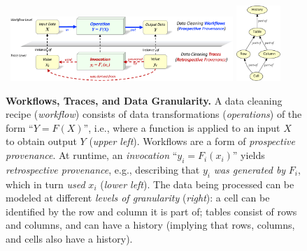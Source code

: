 \documentclass[conference]{ijdc-v14}
\newcommand{\openrefine}{\textrm{OpenRefine}\xspace}
\begin{document}
\begin{figure}[t]
\centering
~\hfill \includegraphics[width=0.75\textwidth]{figures/hybrid-prov-crop.pdf}
\hfill 
\hfill 
\includegraphics[width=0.15\textwidth]{idcc2021/figures/or-data-cm-crop.pdf} 
\hfill
~
\caption{\textbf{Workflows, Traces, and  Data Granularity.} 
A data cleaning recipe (\emph{workflow}) consists of data transformations (\emph{operations}) of the
form ``$Y=F(X)$'', i.e., where a function is applied to an input $X$ to obtain output $Y$
(\emph{upper left}). Workflows are a form of \emph{prospective provenance}. At runtime, an
\emph{invocation} ``$y_i = F_i(x_i)$''  yields \emph{retrospective provenance}, e.g., describing that
$y_i$ \emph{was generated by} $F_i$, which in turn \emph{used} $x_i$
(\emph{lower left}). The data being processed can be modeled at different \emph{levels of
  granularity} (\emph{right}): a {cell} can be identified by the  {row} and {column} it is
part of;  {tables} consist of rows and columns, and can have a {history} (implying that rows, columns, and cells also have a history).}
\label{fig:prov-model}
\end{figure} 




\end{document}
